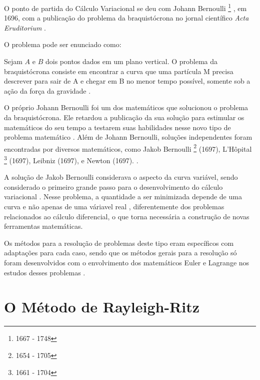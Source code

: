 \documentclass[
	12pt,				%
	openright,			%
    twoside,			%
	a4paper,			%
	english,			%
	french,				%
	spanish,			%
	brazil				%
	]{abntex2}
\numberwithin{lema}{chapter}
\numberwithin{teorema}{chapter}
\numberwithin{definicao}{chapter}
\numberwithin{exemplo}{chapter}
\numberwithin{figure}{chapter}
\newcommand{\bdDate}[2]{
	\footnote{\gtrsymBorn\text{ }#1 - \gtrsymDied\text{ }#2}
}
\begin{document}

O ponto de partida do Cálculo Variacional se deu com Johann Bernoulli\bdDate{1667}{1748}, em 1696, com a publicação do problema da braquistócrona no jornal científico \textit{Acta Eruditorium} \cite{hist_courant}.

O problema pode ser enunciado como:
\begin{citacao}
Sejam $A$ e $B$ dois pontos dados em um plano vertical. O problema da braquistócrona consiste em encontrar a curva que uma partícula M precisa descrever para sair de A e chegar em B no menor tempo possível, somente sob a ação da força da gravidade \cite[p. 3]{calcvar}.
\end{citacao}

O próprio Johann Bernoulli foi um dos matemáticos que solucionou o problema da braquistócrona. Ele retardou a publicação da sua solução para estimular os matemáticos do seu tempo a testarem suas habilidades nesse novo tipo de problema matemático \cite{hist_courant}. Além de Johann Bernoulli, soluções independentes foram encontradas por diversos matemáticos, como Jakob Bernoulli\bdDate{1654}{1705} (1697), L'Hôpital\bdDate{1661}{1704} (1697), Leibniz (1697), e Newton (1697). \cite{hist_still}.

A solução de Jakob Bernoulli considerava o aspecto da curva variável, sendo considerado o primeiro grande passo para o desenvolvimento do cálculo variacional \cite{hist_still}. Nesse problema, a quantidade a ser minimizada depende de uma curva e não apenas de uma váriavel real \cite{hist_courant}, diferentemente dos problemas relacionados ao cálculo diferencial, o que torna necessária a construção de novas ferramentas matemáticas. 

Os métodos para a resolução de problemas deste tipo eram específicos com adaptações para cada caso, sendo que os métodos gerais para a resolução só foram desenvolvidos com o envolvimento dos matemáticos Euler e Lagrange nos estudos desses problemas \cite{hist_courant}.

\section{O Método de Rayleigh-Ritz}
\end{document}

